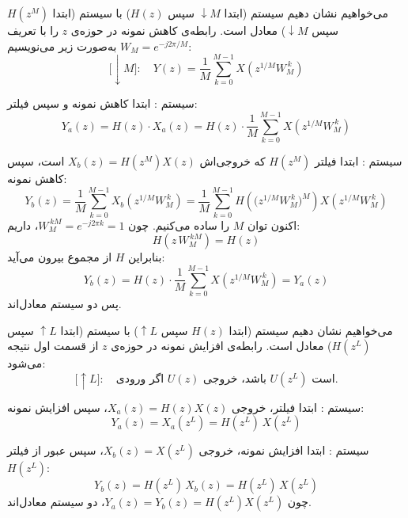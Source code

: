 می‌خواهیم نشان دهیم سیستم  (ابتدا $\downarrow M$ سپس $H(z)$) با سیستم  (ابتدا $H(z^M)$ سپس $\downarrow M$) معادل است. رابطه‌ی کاهش نمونه در حوزه‌ی $z$ را با تعریف $W_M = e^{-j2\pi/M}$ به‌صورت زیر می‌نویسیم:
\[
\big[\downarrow M\big]: \quad Y(z) = \frac{1}{M}\sum_{k=0}^{M-1} X\!\left(z^{1/M} W_M^{\,k}\right)
\]

{سیستم :} ابتدا کاهش نمونه و سپس فیلتر:
\[
Y_a(z) = H(z)\cdot X_a(z)
       = H(z)\cdot \frac{1}{M}\sum_{k=0}^{M-1} X\!\left(z^{1/M} W_M^{\,k}\right)
\]

{سیستم :} ابتدا فیلتر $H(z^M)$ که خروجی‌اش $X_b(z) = H(z^M)X(z)$ است، سپس کاهش نمونه:
\[
Y_b(z) = \frac{1}{M}\sum_{k=0}^{M-1} X_b\!\left(z^{1/M} W_M^{\,k}\right)
       = \frac{1}{M}\sum_{k=0}^{M-1} H\!\left(\big(z^{1/M} W_M^{\,k}\big)^{M}\right) X\!\left(z^{1/M} W_M^{\,k}\right)
\]
اکنون توان $M$ را ساده می‌کنیم. چون $W_M^{\,kM} = e^{-j2\pi k} = 1$، داریم:
\[
H\!\left(z\, W_M^{\,kM}\right) = H(z)
\]
بنابراین $H$ از مجموع بیرون می‌آید:
\[
Y_b(z) = H(z)\cdot \frac{1}{M}\sum_{k=0}^{M-1} X\!\left(z^{1/M} W_M^{\,k}\right) = Y_a(z)
\]
پس دو سیستم معادل‌اند.


می‌خواهیم نشان دهیم سیستم  (ابتدا $H(z)$ سپس $\uparrow L$) با سیستم  (ابتدا $\uparrow L$ سپس $H(z^L)$) معادل است. رابطه‌ی افزایش نمونه در حوزه‌ی $z$ از قسمت اول نتیجه می‌شود:
\[
\big[\uparrow L\big]: \quad \text{اگر ورودی } U(z) \text{ باشد، خروجی } U(z^L) \text{ است.}
\]

{سیستم :} ابتدا فیلتر، خروجی $X_a(z) = H(z)X(z)$، سپس افزایش نمونه:
\[
Y_a(z) = X_a(z^L) = H(z^L)\,X(z^L)
\]

{سیستم :} ابتدا افزایش نمونه، خروجی $X_b(z) = X(z^L)$، سپس عبور از فیلتر $H(z^L)$:
\[
Y_b(z) = H(z^L)\,X_b(z) = H(z^L)\,X(z^L)
\]
چون $Y_a(z) = Y_b(z) = H(z^L)X(z^L)$، دو سیستم معادل‌اند.
